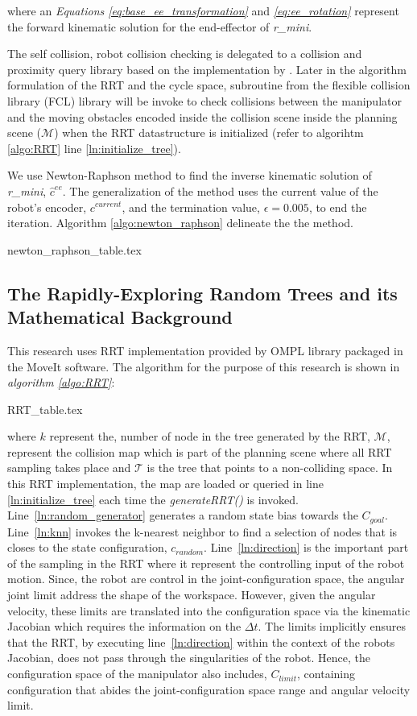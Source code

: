 \documentclass[a4paper, 10pt]{article}
\newcommand\thisPaperDir{/home/asl/version-control/ws_thesis/writing_papers/resampling_planning_in_dynamic_environment}
\numberwithin{equation}{section} %
\newcommand\rimini[0]{\textit{r\_mini}} %
\begin{document}
where an
\textit{Equations \ref{eq:base_ee_transformation}} and \textit{{\ref{eq:ee_rotation}}}
represent the forward kinematic solution for the end-effector of \rimini. 
 

The self collision, robot collision checking is delegated to 
a collision and proximity query library based on the
implementation by \textcite{Pan2012}. Later in the algorithm formulation 
of the RRT and the cycle space, subroutine from
the flexible collision library (FCL) library will be invoke to check collisions between
the manipulator and the moving obstacles encoded
inside the collision scene inside the planning scene ($\mathcal{M}$) when the RRT datastructure
is initialized (refer to algorihtm \ref{algo:RRT} line \ref{ln:initialize_tree}).

We use Newton-Raphson method to find the inverse kinematic solution of 
\rimini, $\hat{c}^{ee}$. The generalization of the method uses the current value of the 
robot's encoder, $c^{current}$, and the termination value, $\epsilon=0.005$,
to end the iteration. Algorithm \ref{algo:newton_raphson} delineate the 
the method.

{newton_raphson_table.tex}

\subsection{The Rapidly-Exploring Random Trees and its Mathematical Background} 
This research uses RRT implementation provided by OMPL library
packaged in the MoveIt software. The algorithm for the purpose 
of this research is shown in \textit{algorithm \ref{algo:RRT}}:

{RRT_table.tex}

where $k$ represent the, number of node in the 
tree generated by the RRT, $\mathcal{M}$, represent the collision map
which is part of the planning scene where all
RRT sampling takes place and $\mathcal{T}$ is the tree 
that points to a non-colliding space. In this RRT implementation, 
the map are loaded or queried in line \ref{ln:initialize_tree} 
each time the \textit{generateRRT()} is invoked.
Line~\ref{ln:random_generator} generates a random state bias towards
the $C_{goal}$.
Line~\ref{ln:knn} invokes the k-nearest neighbor to find a selection 
of nodes that is closes to the state configuration, $c_{random}$.
Line~\ref{ln:direction} is the important part of the sampling 
in the RRT where it represent the controlling input of the
robot motion. Since, the robot are control in the joint-configuration
space, the angular joint limit address the shape
of the workspace. However, given the angular velocity, 
these limits are translated into 
the configuration space via the kinematic Jacobian which requires
the information on the $\Delta t$. The limits implicitly ensures 
that the RRT, by executing line~\ref{ln:direction} within the context 
of the robots Jacobian, does not pass through the singularities of 
the robot. Hence, the configuration space of the manipulator 
also includes, $C_{limit}$, containing configuration
that abides the joint-configuration space range and angular velocity
limit.
\end{document}
